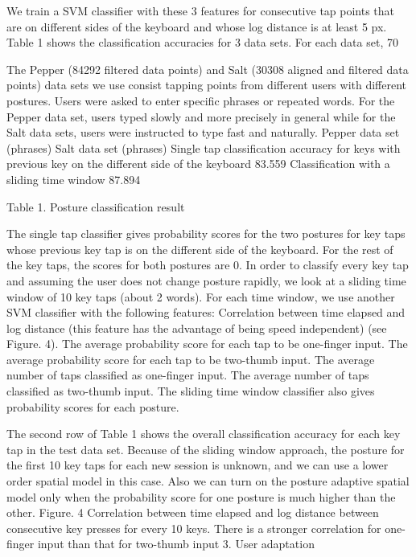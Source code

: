 \documentclass{sigchi}
\begin{document}
We train a SVM classifier with these 3 features for consecutive tap points that are on different sides of the keyboard and whose log distance is at least 5 px. Table 1 shows the classification accuracies for 3 data sets. For each data set, 70%

The Pepper (84292 filtered data points) and Salt (30308 aligned and filtered data points) data sets we use consist tapping points from different users with different postures. Users were asked to enter specific phrases or repeated words. For the Pepper data set, users typed slowly and more precisely in general while for the Salt data sets, users were instructed to type fast and naturally.
Pepper data set (phrases) Salt data set (phrases)
Single tap classification accuracy for keys with previous key on the different side of the keyboard 83.559%
Classification with a sliding time window 87.894%

Table 1. Posture classification result 

The single tap classifier gives probability scores for the two postures for key taps whose previous key tap is on the different side of the keyboard. For the rest of the key taps, the scores for both postures are 0. In order to classify every key tap and assuming the user does not change posture rapidly, we look at a sliding time window of 10 key taps (about 2 words). For each time window, we use another SVM classifier with the following features:
Correlation between time elapsed and log distance (this feature has the advantage of being speed independent) (see Figure. 4).
The average probability score for each tap to be one-finger input.
The average probability score for each tap to be two-thumb input.
The average number of taps classified as one-finger input.
The average number of taps classified as two-thumb input.
The sliding time window classifier also gives probability scores for each posture.

The second row of Table 1 shows the overall classification accuracy for each key tap in the test data set. Because of the sliding window approach, the posture for the first 10 key taps for each new session is unknown, and we can use a lower order spatial model in this case. Also we can turn on the posture adaptive spatial model only when the probability score for one posture is much higher than the other. 
Figure. 4 Correlation between time elapsed and log distance between consecutive 
key presses for every 10 keys. There is a stronger correlation for one- 
finger input than that for two-thumb input
3. User adaptation
\end{document}
